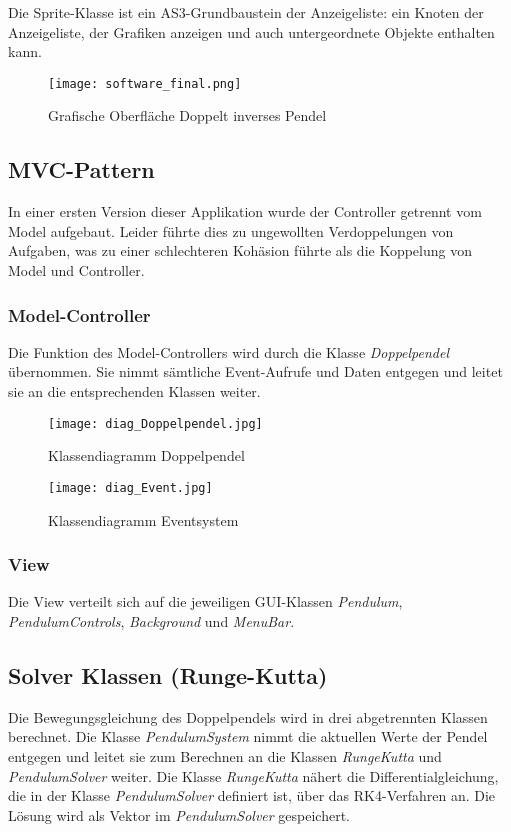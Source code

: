 \documentclass[12pt]{article}
\numberwithin{equation}{subsection}
\begin{document}
Die Sprite-Klasse ist ein AS3-Grundbaustein der Anzeigeliste: ein Knoten der Anzeigeliste, der Grafiken anzeigen und auch untergeordnete Objekte enthalten kann.

\begin{figure}[H]
	\centering
	\texttt{[image: software\_final.png]}
	\caption{Grafische Oberfläche Doppelt inverses Pendel}
	\label{fig:xml}
\end{figure}

\subsection{MVC-Pattern}
In einer ersten Version dieser Applikation wurde der Controller getrennt vom Model aufgebaut. Leider führte dies zu ungewollten Verdoppelungen von Aufgaben, was zu einer schlechteren Kohäsion führte als die Koppelung von Model und Controller.

\subsubsection{Model-Controller}
Die Funktion des Model-Controllers wird durch die Klasse \textit{Doppelpendel} übernommen. Sie nimmt sämtliche Event-Aufrufe und Daten entgegen und leitet sie an die entsprechenden Klassen weiter.

\begin{figure}[H]
	\centering
	\texttt{[image: diag\_Doppelpendel.jpg]}
	\caption{Klassendiagramm Doppelpendel}
	\label{fig:xml}
\end{figure}

\begin{figure}[H]
	\centering
	\texttt{[image: diag\_Event.jpg]}
	\caption{Klassendiagramm Eventsystem}
	\label{fig:xml}
\end{figure}

\subsubsection{View}
Die View verteilt sich auf die jeweiligen GUI-Klassen \textit{Pendulum}, \textit{PendulumControls}, \textit{Background} und \textit{MenuBar}.

\subsection{Solver Klassen (Runge-Kutta)}
Die Bewegungsgleichung des Doppelpendels wird in drei abgetrennten Klassen berechnet. Die Klasse \textit{PendulumSystem} nimmt die aktuellen Werte der Pendel entgegen und leitet sie zum Berechnen an die Klassen \textit{RungeKutta} und \textit{PendulumSolver} weiter. Die Klasse \textit{RungeKutta} nähert die Differentialgleichung, die in der Klasse \textit{PendulumSolver} definiert ist, über das RK4-Verfahren an. Die Lösung wird als Vektor im \textit{PendulumSolver} gespeichert.
\end{document}
